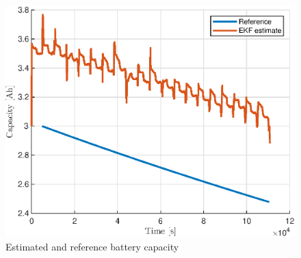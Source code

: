 \begin{figure}
    \centering
    \includegraphics{figures/9/capacity-estimate.eps}
    \caption{Estimated and reference battery capacity}
    \label{fig:9-capacity}
\end{figure}

